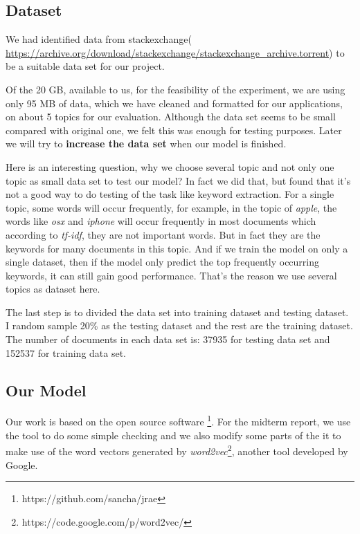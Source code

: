 \documentclass[dvips,9pt]{article}
\begin{document}
		\subsection{Dataset}
		
		We had identified data from stackexchange( \url{https://archive.org/download/stackexchange/stackexchange_archive.torrent}) to be a suitable data set for our project. 
		
		Of the 20 GB, available to us, for the feasibility of the experiment, we are using only 95 MB of data, which we have cleaned and formatted for our applications, on about 5 topics for our evaluation. Although the data set seems to be small compared with original one, we felt this was enough for testing purposes. Later we will try to \textbf{increase the data set} when our model is finished.
        
        Here is an interesting question, why we choose several topic and not only one topic as small data set to test our model? In fact we did that, but found that it's not a good way to do testing of the task like keyword extraction. For a single topic, some words will occur frequently, for example, in the topic of \emph{apple}, the words like \emph{osx} and \emph{iphone} will occur frequently in most documents which according to \emph{tf-idf}, they are not important words. But in fact they are the keywords for many documents in this topic. And if we train the model on only a single dataset, then if the model only predict the top frequently occurring keywords, it can still gain good performance. That's the reason we use several topics as dataset here.
        
        The last step is to divided the data set into training dataset and testing dataset. I random sample 20\% as the testing dataset and the rest are the training dataset. The number of documents in each data set is: 37935 for testing data set and 152537 for training data set.
        \subsection{Our Model}
        Our work is based on the open source software \footnote{https://github.com/sancha/jrae}. For the midterm report, we use the tool to do some simple checking and we also modify some parts of the it to make use of the word vectors generated by \emph{word2vec}\footnote{https://code.google.com/p/word2vec/}, another tool developed by Google.
        
\end{document}
